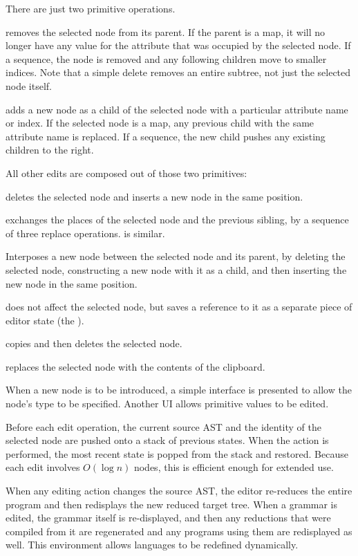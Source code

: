 There are just two primitive operations.

 removes the selected node from its parent. If the parent is a map, it will no longer have any value for the attribute that was occupied by the selected node. If a sequence, the node is removed and any following children move to smaller indices. Note that a simple delete removes an entire subtree, not just the selected node itself.

 adds a new node as a child of the selected node with a particular attribute name or index. If the selected node is a map, any previous child with the same attribute name is replaced. If a sequence, the new child pushes any existing children to the right.

All other edits are composed out of those two primitives:

 deletes the selected node and inserts a new node in the same position.

 exchanges the places of the selected node and the previous sibling, by a sequence of three replace operations.  is similar.

 Interposes a new node between the selected node and its parent, by deleting the selected node, constructing a new node with it as a child, and then inserting the new node in the same position.



 does not affect the selected node, but saves a reference to it as a separate piece of editor state (the ).

 copies and then deletes the selected node.

 replaces the selected node with the contents of the clipboard.

When a new node is to be introduced, a simple interface is presented to allow the node's type to be specified. Another UI allows primitive values to be edited.

Before each edit operation, the current source AST and the identity of the selected node are pushed onto a stack of previous states. When the  action is performed, the most recent state is popped from the stack and restored. Because each edit involves $O(\log n)$ nodes, this is efficient enough for extended use.

When any editing action changes the source AST, the editor re-reduces the entire program and then redisplays the new reduced target tree. When a grammar is edited, the grammar itself is re-displayed, and then any reductions that were compiled from it are regenerated and any programs using them are redisplayed as well. This environment allows languages to be redefined dynamically.


